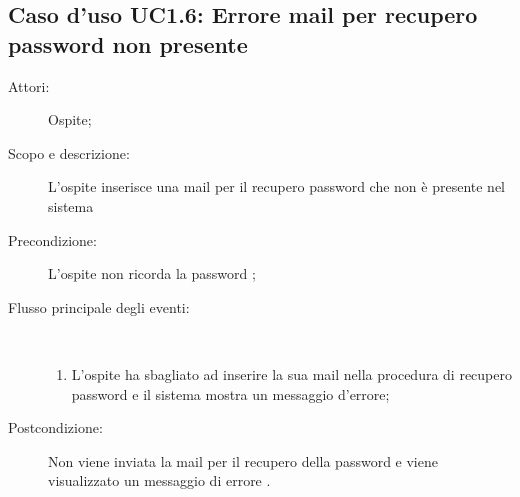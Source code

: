 \subsection{Caso d'uso UC1.6: Errore mail per recupero password non presente}\begin{description}
	\item[Attori:] Ospite;
	\item[Scopo e descrizione:] L'ospite inserisce una mail per il recupero password che non è presente nel sistema
	
	\item[Precondizione:] L'ospite non ricorda la password
	;
	
	\item[Flusso principale degli eventi:] \ 
	\begin{enumerate}
		\item L'ospite ha sbagliato ad inserire la sua mail nella procedura di recupero password e il sistema mostra un messaggio d'errore;
		
	\end{enumerate}
	\item[Postcondizione:] Non viene inviata la mail per il recupero della password e viene visualizzato un messaggio di errore
	.
\end{description}
\hypertarget{UC2}{}
